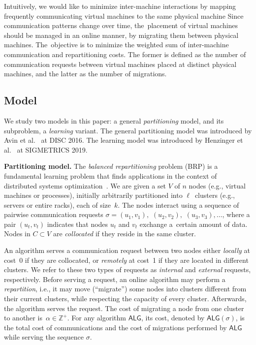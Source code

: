 \documentclass[manuscript,screen=true, review, anonymous]{acmart}
\newcommand{\ALG}{\textsf{ALG}\xspace}
\newcommand{\OBRP}{BRP}
\begin{document}
Intuitively, we would like to minimize inter-machine
interactions by mapping frequently communicating virtual machines to the same physical machine
Since communication patterns change over time, the~placement of virtual machines should be managed in an online manner, by migrating them between physical machines.
The~objective is to minimize the weighted sum of inter-machine communication and repartitioning costs.
The former is defined as the number of communication requests between virtual machines placed at distinct physical machines, and the latter as the number of migrations.



\subsection{Model}

We study two models in this paper: a general \emph{partitioning} model, and its subproblem, a \emph{learning} variant.
The general partitioning model was introduced by Avin et al.~\cite{repartition-disc} at DISC 2016.
The learning model was introduced by Henzinger et al.~\cite{sigmetrics19_partitioning} at SIGMETRICS 2019.


\noindent
\textbf{Partitioning model.}
The \emph{balanced repartitioning} problem (\OBRP{})
is a fundamental learning problem
that finds applications in the context of
distributed systems optimization~\cite{repartition-disc}. We are given a set $V$ of $n$ nodes 
(e.g., virtual machines or processes),
initially arbitrarily partitioned into $\ell$~clusters
(e.g., servers or entire racks),
each of size~$k$.
The nodes interact using
a sequence of pairwise communication requests
$\sigma = (u_1,v_1),$ $(u_2,v_2),$ $(u_3,v_3), \ldots$,
where a pair $(u_t,v_t)$ indicates that nodes $u_t$ and $v_t$ exchange a~certain amount of data.
Nodes in $C \subset V$ are \emph{collocated}
if they reside in the same cluster.

An algorithm serves a communication request between two nodes
either \emph{locally} at cost~0
if they are collocated,
or \emph{remotely} at cost~1
if they are located in different clusters.
We refer to these two types of requests as \emph{internal}
and \emph{external} requests, respectively.
Before serving a request,
an online algorithm may perform a \emph{repartition},
i.e.,
it may move (``migrate'') some nodes into clusters different from their current clusters, while respecting the capacity of every cluster. 
Afterwards, 
the algorithm serves the  request.
The cost of migrating a node from one cluster to another
is~$\alpha \in \mathbb{Z}^+$.
For any algorithm $\ALG$,
its cost,
denoted by $\ALG(\sigma)$,
is the total cost of communications and
the cost of migrations performed by $\ALG$ while serving the sequence $\sigma$.
\end{document}
